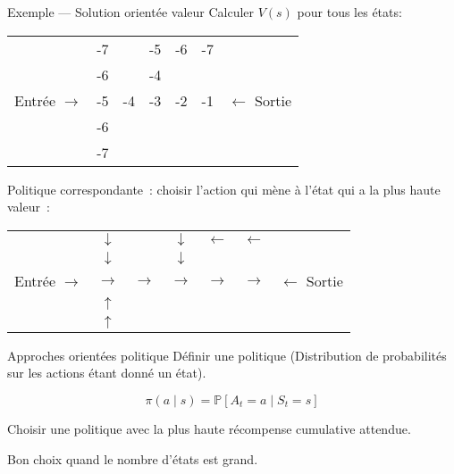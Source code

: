 \begin{frame}{Exemple --- Solution orientée valeur}
  Calculer $V(s)$ pour tous les états:

  \begin{tabular}{c|c|c|c|c|c|c}
    \cline{2-6}
      & -7 & \cellcolor{black} & -5 & -6 & -7 & \\
      \cline{2-6}
      & -6 & \cellcolor{black} & -4 & \cellcolor{black} & \cellcolor{black} & \\
      \cline{2-6}
      Entrée $\rightarrow$ & -5 & -4 & -3 & -2 & -1 & $\leftarrow$ Sortie \\
      \cline{2-6}
      & -6 & \cellcolor{black} & \cellcolor{black} & \cellcolor{black} & \cellcolor{black} & \\
      \cline{2-6}
      & -7 & \cellcolor{black} & \cellcolor{black} & \cellcolor{black} & \cellcolor{black} & \\
      \cline{2-6}
  \end{tabular}

  \pause

  Politique correspondante~: choisir l'action qui mène à l'état qui a la plus haute valeur~:

  \begin{tabular}{c|c|c|c|c|c|c}
    \cline{2-6}
      & $\downarrow$ & \cellcolor{black} & $\downarrow$ & $\leftarrow$ & $\leftarrow$ & \\
      \cline{2-6}
      & $\downarrow$ & \cellcolor{black} & $\downarrow$ & \cellcolor{black} & \cellcolor{black} & \\
      \cline{2-6}
      Entrée $\rightarrow$ & $\rightarrow$ & $\rightarrow$ & $\rightarrow$ & $\rightarrow$ & $\rightarrow$ & $\leftarrow$ Sortie \\
      \cline{2-6}
      & $\uparrow$ & \cellcolor{black} & \cellcolor{black} & \cellcolor{black} & \cellcolor{black} & \\
      \cline{2-6}
      & $\uparrow$ & \cellcolor{black} & \cellcolor{black} & \cellcolor{black} & \cellcolor{black} & \\
      \cline{2-6}
  \end{tabular}
\end{frame}

\begin{frame}{Approches orientées politique}
  Définir une politique (Distribution de probabilités sur les actions étant donné un état).

  \[
    \pi(a \mid s) = \mathbb{P}[A_t = a \mid S_t = s]
  \]

  Choisir une politique avec la plus haute récompense cumulative attendue.

  Bon choix quand le nombre d'états est grand.
\end{frame}

